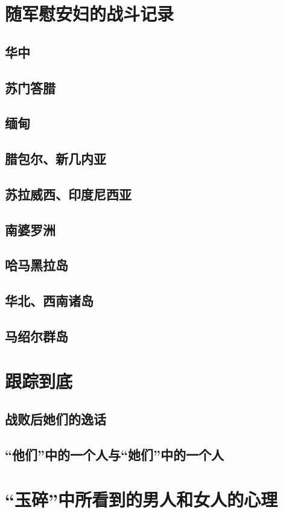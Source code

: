 \documentclass[12pt,UTF8]{ctexbook}
\begin{document}
\chapter{随军慰安妇的战斗记录}

\section{华中}
\section{苏门答腊}
\section{缅甸}
\section{腊包尔、新几内亚}
\section{苏拉威西、印度尼西亚}
\section{南婆罗洲}
\section{哈马黑拉岛}
\section{华北、西南诸岛}
\section{马绍尔群岛}

\chapter{跟踪到底}

\section{战败后她们的逸话}
\section{“他们”中的一个人与“她们”中的一个人}

\chapter{“玉碎”中所看到的男人和女人的心理}
\end{document}
